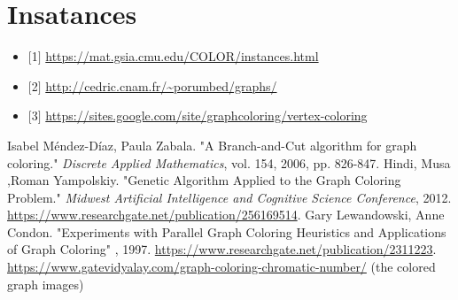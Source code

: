 \documentclass[10pt]{article}
\begin{document}
\section{Insatances}
\begin{itemize}
\item $[$1$]$ \url{https://mat.gsia.cmu.edu/COLOR/instances.html}
\item $[$2$]$ \url{http://cedric.cnam.fr/~porumbed/graphs/}
\item $[$3$]$ \url{https://sites.google.com/site/graphcoloring/vertex-coloring}
\end{itemize}

\begin{thebibliography}{9}

Isabel Méndez-Díaz, Paula Zabala. "A Branch-and-Cut algorithm for graph coloring." \emph{Discrete Applied Mathematics}, vol. 154, 2006, pp. 826-847.
 Hindi, Musa ,Roman Yampolskiy.
"Genetic Algorithm Applied to the Graph Coloring Problem." \emph{Midwest Artificial Intelligence and Cognitive Science Conference}, 2012. \url{https://www.researchgate.net/publication/256169514}.
 Gary Lewandowski, Anne Condon.
"Experiments with Parallel Graph Coloring Heuristics and Applications of Graph Coloring" , 1997. \url{https://www.researchgate.net/publication/2311223}.
 \url{https://www.gatevidyalay.com/graph-coloring-chromatic-number/} (the colored graph images)

\end{thebibliography}
\end{document}
